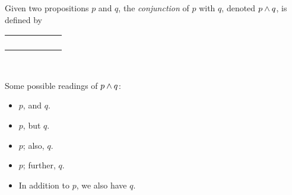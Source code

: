 \begin{definition}[Conjunction]
    \begin{center}
        \begin{minipage}[t]{.55\linewidth}
            Given two propositions $p$ and $q$, the \emph{conjunction} of $p$ with $q$,
            denoted $p \wedge q$, is defined by
            \begin{table}[H]
                \centering
                \label{tab:and}
                \begin{tabular}{|CcCc||Cc|}
                    \hline
                     &  &  \\ \hline
                    \thead{$\top$} & \thead{$\top$} &  \\
                    \thead{$\top$} & \thead{$\bot$} &  \\
                    \thead{$\bot$} & \thead{$\top$} &  \\
                    \thead{$\bot$} & \thead{$\bot$} &  \\ \hline
                \end{tabular}
            \end{table}
        \end{minipage}%
        \begin{minipage}[t]{.05\linewidth}
            ~
        \end{minipage}%
        \begin{minipage}[t]{.4\linewidth}
            Some possible readings of $p \wedge q$:\\
            \begin{itemize}
                \item[\cdot]
                    $p$, and $q$.
                \item[\cdot]
                    $p$, but $q$.
                \item[\cdot]
                    $p$; also, $q$.
                \item[\cdot]
                    $p$; further, $q$.
                \item[\cdot]
                    In addition to $p$, we also have $q$.
            \end{itemize}
        \end{minipage}
    \end{center}
\end{definition}


